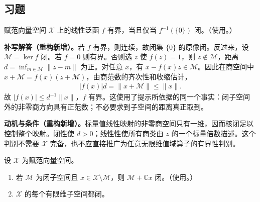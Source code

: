 \documentclass[../../main.tex]{subfiles}
\begin{document}
\subsection*{习题}
\begin{exercise}\label{exercise:ch05-functional-closed-kernel}
赋范向量空间 $\mathcal X$ 上的线性泛函 $f$ 有界，当且仅当 $f^{-1}(\{0\})$ 闭。（使用。）
\end{exercise}
\begin{solution}
\textbf{补写解答（重构新增）。}若 $f$ 有界，则连续，故闭集 $\{0\}$ 的原像闭。反过来，设 $\mathcal M=\ker f$ 闭。若 $f=0$ 则有界。否则选 $z$ 使 $f(z)=1$，则 $z\notin\mathcal M$，距离 $d=\inf_{m\in\mathcal M}\|z-m\|$ 为正。对任意 $x$，有 $x-f(x)z\in\mathcal M$。因此在商空间中 $x+\mathcal M=f(x)(z+\mathcal M)$，由商范数的齐次性和收缩估计，
\begin{align*}
|f(x)|d=\|x+\mathcal M\|\le\|x\|.
\end{align*}
故 $|f(x)|\le d^{-1}\|x\|$，$f$ 有界。这使用了提示所依据的同一个事实：闭子空间外的非零商方向具有正范数；不必要求到子空间的距离真正取到。
\end{solution}
\begin{remark}
\textbf{动机与条件（重构新增）。}标量值线性映射的非零商空间只有一维，因而核闭足以控制整个映射。闭性使 $d>0$；线性性使所有商类由 $z$ 的一个标量倍数描述。这个判别不需要 $\mathcal X$ 完备，也不应直接推广为任意无限维值域算子的有界性判别。
\end{remark}
\begin{exercise}\label{exercise:ch05-finite-subspace-closed}
设 $\mathcal X$ 为赋范向量空间。
\begin{enumerate}
\item\label{item:ch05-adjoin-one-closed} 若 $\mathcal M$ 为闭子空间且 $x\in\mathcal X\setminus\mathcal M$，则 $\mathcal M+\mathbb Cx$ 闭。（使用。）
\item\label{item:ch05-finite-dim-closed} $\mathcal X$ 的每个有限维子空间都闭。
\end{enumerate}
\end{exercise}
\end{document}
